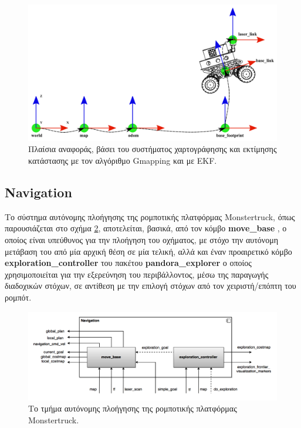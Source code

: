 \begin{figure}[!ht]
	\centering
	\includegraphics[width=\linewidth]{Chapters/Chapter4/Figures/slam_2_reference_frames.png}
	\caption{Πλαίσια αναφοράς, βάσει του συστήματος χαρτογράφησης και εκτίμησης κατάστασης με τον αλγόριθμο Gmapping και με EKF.}
	\label{fig:slam_2_reference_frames}
\end{figure}

\subsection{Navigation} \label{ssec:navigation_system_architecture}
Το σύστημα αυτόνομης πλοήγησης της ρομποτικής πλατφόρμας Monstertruck, όπως παρουσιάζεται στο σχήμα \ref{fig:navigation_component_diagram}, αποτελείται, βασικά, από τον κόμβο \textbf{move{\_}base} \cite{move_base}, ο οποίος είναι υπεύθυνος για την πλοήγηση του οχήματος, με στόχο την αυτόνομη μετάβαση του από μία αρχική θέση σε μία τελική, αλλά και έναν προαιρετικό κόμβο \textbf{exploration{\_}controller} του πακέτου \textbf{pandora{\_}explorer} ο οποίος χρησιμοποιείται για την εξερεύνηση του περιβάλλοντος, μέσω της παραγωγής διαδοχικών στόχων, σε αντίθεση με την επιλογή στόχων από τον χειριστή/επόπτη του ρομπότ.

\begin{figure}[!ht]
	\centering
	\includegraphics[width=\linewidth]{Chapters/Chapter4/Figures/navigation_component_diagram.png}
	\caption{Το τμήμα αυτόνομης πλοήγησης της ρομποτικής πλατφόρμας Monstertruck.}
	\label{fig:navigation_component_diagram}
\end{figure}

